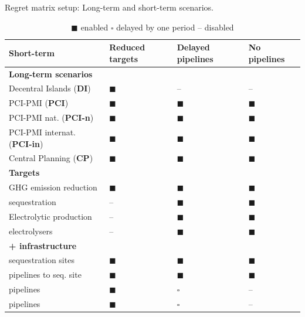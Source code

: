 \documentclass[final,5p,times,twocolumn,sort&compress]{elsarticle}
\begin{document}
\begin{table}[t]
  \centering
  \caption{Regret matrix setup: Long-term and short-term scenarios.}
  \label{tab:regret_matrix_setup}
  \scriptsize
  \begin{tabularx}{\linewidth}{R{2.8cm}>{\centering\arraybackslash}X>{\centering\arraybackslash}X>{\centering\arraybackslash}X}
    \toprule
    \textbf{Short-term} & \textbf{Reduced targets} & \textbf{Delayed pipelines} & \textbf{No pipelines} \\
    \midrule
    \textbf{Long-term scenarios} & & & \\
    Decentral Islands (\textbf{DI}) & $\blacksquare$ & -- & -- \\
    PCI-PMI (\textbf{PCI}) & $\blacksquare$ & $\blacksquare$ & $\blacksquare$ \\
    PCI-PMI nat. (\textbf{PCI-n}) & $\blacksquare$ & $\blacksquare$ & $\blacksquare$\\
    PCI-PMI internat. (\textbf{PCI-in}) & $\blacksquare$ & $\blacksquare$ & $\blacksquare$ \\
    Central Planning (\textbf{CP}) & $\blacksquare$ & $\blacksquare$ & $\blacksquare$ \\
    \midrule
    \textbf{Targets} & & & \\
    GHG emission reduction &  $\blacksquare$ &  $\blacksquare$ &  $\blacksquare$ \\
     sequestration &  -- &  $\blacksquare$ &  $\blacksquare$ \\
    Electrolytic  production &  -- &  $\blacksquare$ &  $\blacksquare$ \\
     electrolysers &  -- &  $\blacksquare$ &  $\blacksquare$ \\
    \midrule
    \textbf{ +  infrastructure} & & & \\
     sequestration sites & $\blacksquare$ &  $\blacksquare$ &  $\blacksquare$ \\
     pipelines to seq. site & $\blacksquare$ &  $\blacksquare$ &  $\blacksquare$ \\
     pipelines & $\blacksquare$ &  $\square$ &  -- \\
     pipelines & $\blacksquare$ &  $\square$ &  -- \\
    \bottomrule
  \end{tabularx}
  \caption*{\scriptsize $\blacksquare$ enabled \quad $\square$ delayed by one period \quad -- disabled}
\end{table}
\end{document}

